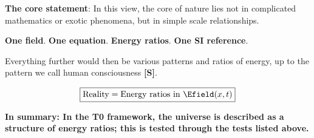 	\textbf{The core statement}: In this view, the core of nature lies not in complicated mathematics or exotic phenomena, but in simple scale relationships.
	
	\textbf{One field}. \textbf{One equation}. \textbf{Energy ratios}. \textbf{One SI reference}.
	
	Everything further would then be various patterns and ratios of energy, up to the pattern we call human consciousness \textbf{[S]}.
	
	\begin{equation}
		\boxed{\text{Reality} = \text{Energy ratios in } \Efield(x,t)}
	\end{equation}
	
	\textbf{In summary: In the T0 framework, the universe is described as a structure of energy ratios; this is tested through the tests listed above.}
	

